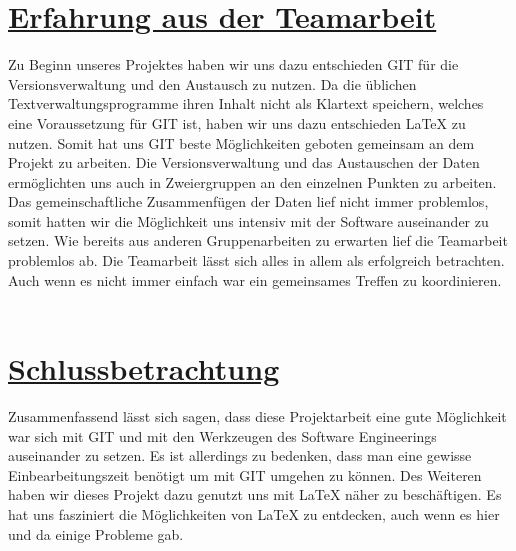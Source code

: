 \documentclass[a4paper]{article}
\begin{document}
\newpage	
\printglossary[title={Glossar}, numberedsection]


\newpage		
\section{\underline{Erfahrung aus der Teamarbeit}}

Zu Beginn unseres Projektes haben wir uns dazu entschieden GIT für die Versionsverwaltung und den Austausch zu nutzen. Da die üblichen Textverwaltungsprogramme ihren Inhalt nicht als Klartext speichern, welches eine Voraussetzung für GIT ist, haben wir uns dazu entschieden \LaTeX{} zu nutzen. Somit hat uns GIT beste Möglichkeiten geboten gemeinsam an dem Projekt zu arbeiten. Die Versionsverwaltung und das Austauschen der Daten ermöglichten uns auch in Zweiergruppen an den einzelnen Punkten zu arbeiten. Das gemeinschaftliche Zusammenfügen der Daten lief nicht immer problemlos, somit hatten wir die Möglichkeit uns intensiv mit der Software auseinander zu setzen. Wie bereits aus anderen Gruppenarbeiten zu erwarten lief die Teamarbeit problemlos ab. 
Die Teamarbeit lässt sich alles in allem als erfolgreich betrachten. Auch wenn es nicht immer einfach war ein gemeinsames Treffen zu koordinieren. 
\\\\

\section{\underline{Schlussbetrachtung}}
	
Zusammenfassend lässt sich sagen, dass diese Projektarbeit eine gute Möglichkeit war sich mit GIT und mit den Werkzeugen des Software Engineerings auseinander zu setzen. Es ist allerdings zu bedenken, dass man eine gewisse Einbearbeitungszeit benötigt um mit GIT umgehen zu können. Des Weiteren haben wir dieses Projekt dazu genutzt uns mit \LaTeX{} näher zu beschäftigen. Es hat uns fasziniert die Möglichkeiten von \LaTeX{} zu entdecken, auch wenn es hier und da einige Probleme gab.\\
\end{document}
